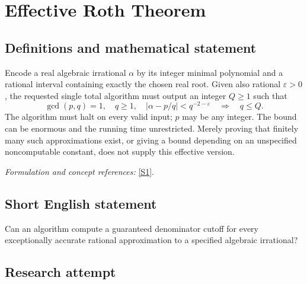\documentclass[11pt,a4paper]{article}
\newcommand{\eps}{\varepsilon}
\newcommand{\sref}[2]{\hyperlink{source:#1:#2}{[S#2]}}
\newif\ifshowcatalogue
\newcommand{\cataloguescope}[1]{\ifshowcatalogue
 \paragraph{Exact scope in the supplied catalogue.}
 \begin{quote}\small #1\end{quote}\fi}
\begin{document}
\setcounter{section}{0}
\clearpage
\section*{\texorpdfstring{Effective Roth Theorem}{Effective Roth Theorem}}\label{30006790}
\subsection{Definitions and mathematical statement}
Encode a real algebraic irrational $\alpha$ by its integer minimal polynomial and a rational interval containing exactly the chosen real root. Given also rational $\eps>0$, the requested single total algorithm must output an integer $Q\ge1$ such that
\[
 \gcd(p,q)=1,\quad q\ge1,\quad
 |\alpha-p/q|<q^{-2-\eps}\quad\Longrightarrow\quad q\le Q.
\]
The algorithm must halt on every valid input; $p$ may be any integer. The bound can be enormous and the running time unrestricted. Merely proving that finitely many such approximations exist, or giving a bound depending on an unspecified noncomputable constant, does not supply this effective version.
\par\smallskip\textit{Formulation and concept references:} \sref{30006790}{1}.
\cataloguescope{There exists one total computable algorithm which, given a real algebraic irrational alpha by its integer minimal polynomial and a rational isolating interval, and a positive rational epsilon, returns an integer Q>=1 such that every reduced rational p/q, with p an integer and q>=1 an integer, satisfying |alpha-p/q|<q\textasciicircum{}(-2-epsilon) has q<=Q. The algorithm must halt with this guarantee on every valid input. No time, space, practical-size or software-implementation requirement is imposed.}
\subsection{Short English statement}
Can an algorithm compute a guaranteed denominator cutoff for every exceptionally accurate rational approximation to a specified algebraic irrational?
\subsection{Research attempt}
\end{document}
